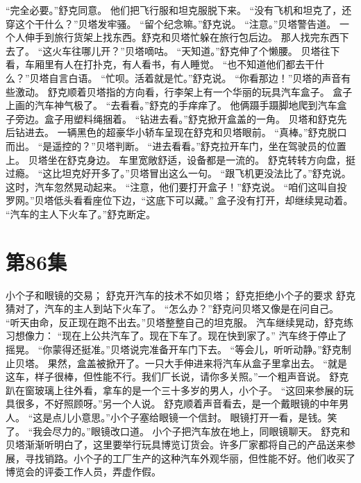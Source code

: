 \documentclass[a4paper,12pt,UTF8,twoside]{ctexbook}
\begin{document}
        “完全必要。”舒克同意。 
        他们把飞行服和坦克服脱下来。 
        “没有飞机和坦克了，还穿这个干什么？”贝塔发牢骚。 
        “留个纪念嘛。”舒克说。 
        “注意。”贝塔警告道。 
        一个人伸手到旅行货架上找东西。舒克和贝塔忙躲在旅行包后边。 
        那人找完东西下去了。 
        “这火车往哪儿开？”贝塔嘀咕。 
        “天知道。”舒克伸了个懒腰。 
        贝塔往下看，车厢里有人在打扑克，有人看书，有人睡觉。 
        “也不知道他们都去干什么？”贝塔自言白语。 
        “忙呗。活着就是忙。”舒克说。 
        “你看那边！”贝塔的声音有些激动。 
        舒克顺着贝塔指的方向看，行李架上有一个华丽的玩具汽车盒子。 
        盒子上画的汽车神气极了。 
        “去看看。”舒克的手痒痒了。 
        他俩蹑手蹑脚地爬到汽车盒子旁边。盒子用塑料绳捆着。 
        “钻进去看。”舒克掀开盒盖的一角。 
        贝塔和舒克先后钻进去。 
        一辆黑色的超豪华小轿车呈现在舒克和贝塔眼前。 
        “真棒。”舒克脱口而出。 
        “是遥控的？”贝塔判断。 
        “进去看看。”舒克拉开车门，坐在驾驶员的位置上。 
        贝塔坐在舒克身边。 
        车里宽敞舒适，设备都是一流的。 
        舒克转转方向盘，挺过瘾。 
        “这比坦克好开多了。”贝塔冒出这么一句。 
        “跟飞机更没法比了。”舒克说。 
        这时，汽车忽然晃动起来。 
       “注意，他们要打开盒子！”舒克说。 
        “咱们这叫自投罗网。”贝塔低头看看座位下边，“这底下可以藏。” 
      盒子没有打开，却继续晃动着。 
      “汽车的主人下火车了。”舒克断定。   \chapter{第86集} 
        小个子和眼镜的交易； 
        舒克开汽车的技术不如贝塔； 
        舒克拒绝小个子的要求   
        舒克猜对了，汽车的主人到站下火车了。 
        “怎么办？”舒克问贝塔又像是在问自己。 
        “听天由命，反正现在跑不出去。”贝塔整整自己的坦克服。 
        汽车继续晃动，舒克练习想像力： 
        “现在上公共汽车了。现在下车了。现在快到家了。” 
        汽车终于停止了摇晃。 
        “你蒙得还挺准。”贝塔说完准备开车门下去。 
        “等会儿，听听动静。”舒克制止贝塔。 
        果然，盒盖被掀开了。一只大手伸进来将汽车从盒子里拿出去。 
        “就是这车，样子很棒，但性能不行。我们厂长说，请你多关照。”一个粗声音说。 
        舒克趴在窗玻璃上往外看，拿车的是一个三十多岁的男人，小个子。 
        “这回来参展的玩具很多，不好照顾呀。”另一个人说。 
        舒克顺着声音看去，是一个戴眼镜的中年男人。 
        “这是点儿小意思。”小个子塞给眼镜一个信封。 
        眼镜打开一看，是钱。笑了。 
        “我会尽力的。”眼镜改口道。 
        小个子把汽车放在地上，同眼镜聊天。 
        舒克和贝塔渐渐听明白了，这里要举行玩具博览订货会。许多厂家都将自己的产品送来参展，寻找销路。小个子的工厂生产的这种汽车外观华丽，但性能不好。他们收买了博览会的评委工作人员，弄虚作假。 
\end{document}
